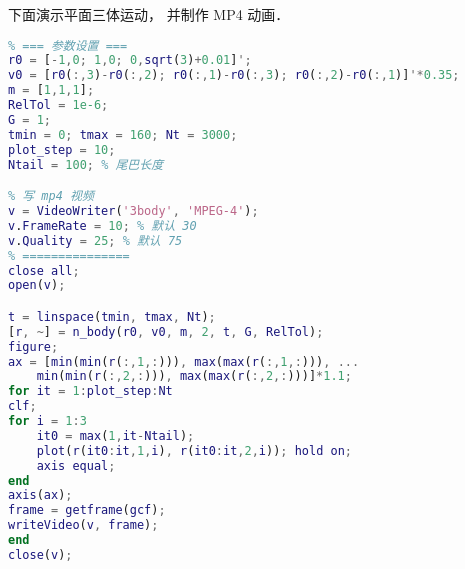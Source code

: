 下面演示平面三体运动， 并制作 MP4 动画．
\begin{lstlisting}[language=matlab, caption=three\_body.m]
% 平面三体运动演示
% === 参数设置 ===
r0 = [-1,0; 1,0; 0,sqrt(3)+0.01]';
v0 = [r0(:,3)-r0(:,2); r0(:,1)-r0(:,3); r0(:,2)-r0(:,1)]'*0.35;
m = [1,1,1];
RelTol = 1e-6;
G = 1;
tmin = 0; tmax = 160; Nt = 3000;
plot_step = 10;
Ntail = 100; % 尾巴长度

% 写 mp4 视频
v = VideoWriter('3body', 'MPEG-4');
v.FrameRate = 10; % 默认 30
v.Quality = 25; % 默认 75
% ===============
close all;
open(v);

t = linspace(tmin, tmax, Nt);
[r, ~] = n_body(r0, v0, m, 2, t, G, RelTol);
figure;
ax = [min(min(r(:,1,:))), max(max(r(:,1,:))), ...
    min(min(r(:,2,:))), max(max(r(:,2,:)))]*1.1;
for it = 1:plot_step:Nt
clf;
for i = 1:3
    it0 = max(1,it-Ntail);
    plot(r(it0:it,1,i), r(it0:it,2,i)); hold on;
    axis equal;
end
axis(ax);
frame = getframe(gcf);
writeVideo(v, frame);
end
close(v);
\end{lstlisting}
